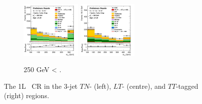 \begin{figure}[h!]
\begin{subfigure}[b]{\textwidth}
        \includegraphics[width=0.32\textwidth]{Images/VH/Own_fit/prefit_VHcc/Region_distmBB_BMin250_DCRHigh_J3_TTypelt_T2_L1_Y6051_Prefit.png}
        \includegraphics[width=0.32\textwidth]{Images/VH/Own_fit/prefit_VHcc/Region_distmBB_BMin250_DCRHigh_J3_TTypett_T2_L1_Y6051_Prefit.png}
        \caption{250 GeV < \ptv.}
        \label{fig:plots_VHcc_1L_250_CRH_3J}
    \end{subfigure}
    \caption{The 1L \highdr\ CR in the 3-jet $TN$- (left), $LT$- (centre), and $TT$-tagged (right) regions.}
    \label{fig:plots_VHcc_1L_CRH_3J}
\end{figure}

\vspace*{\fill} \newpage
\vspace*{\fill} 

